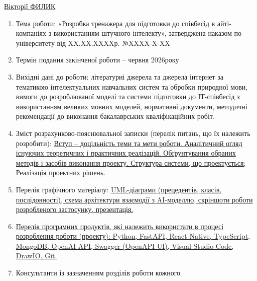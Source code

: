 \documentclass[
]{article}
\begin{document}
\ul{Вікторії ФИЛИК}

\begin{enumerate}
\def\labelenumi{\arabic{enumi}.}
\item
  Тема роботи: «Розробка тренажера для підготовки до співбесід в
  айті-компаніях з використанням штучного інтелекту», затверджена
  наказом по університету від XX.XX.XXXXр. №XXXX-X-XX
\item
  Термін подання закінченої роботи -- червня 2026року
\item
  Вихідні дані до роботи: літературні джерела та джерела інтернет за
  тематикою інтелектуальних навчальних систем та обробки природної мови,
  вимоги до розроблюваної моделі та системи підготовки до ІТ-співбесід з
  використанням великих мовних моделей, нормативні документи, методичні
  рекомендації до виконання бакалаврських кваліфікаційних робіт.
\item
  Зміст розрахунково-пояснювальної записки (перелік питань, що їх
  належить розробити): \ul{Вступ -- доцільність теми та мети роботи.
  Аналітичний огляд існуючих теоретичних і практичних реалізацій.
  Обґрунтування обраних методів і засобів виконання проекту. Структура
  системи, що проектується; Реалізація проектних рішень.}
\item
  Перелік графічного матеріалу: \ul{UML-діаграми (прецедентів, класів,
  послідовності), схема архітектури взаємодії з AI-моделлю, скріншоти
  роботи розробленого застосунку, презентація.}
\item
  \ul{Перелік програмних продуктів, які належить використати в процесі
  розроблення роботи (проекту): Python, FastAPI, React Native,
  TypeScript, MongoDB, OpenAI API, Swagger (OpenAPI UI), Visual Studio
  Code, DrawIO, Git.}
\item
  Консультанти із зазначенням розділів роботи кожного
\end{enumerate}
\end{document}
